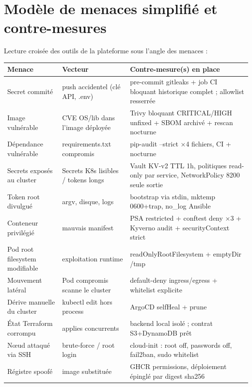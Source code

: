 \documentclass[12pt,a4paper]{article}
\begin{document}
\section{Modèle de menaces simplifié et contre-mesures}

Lecture croisée des outils de la plateforme sous l'angle des menaces :

\begin{longtable}{@{}p{3.6cm}p{5.6cm}p{5.0cm}@{}}
\toprule
\textbf{Menace} & \textbf{Vecteur} & \textbf{Contre-mesure(s) en place} \\
\midrule
\endhead
Secret commité & push accidentel (clé API, .env) & pre-commit gitleaks + job CI bloquant historique complet ; allowlist resserrée \\
Image vulnérable & CVE OS/lib dans l'image déployée & Trivy bloquant CRITICAL/HIGH unfixed + SBOM archivé + rescan nocturne \\
Dépendance vulnérable & requirements.txt compromis & pip-audit --strict ×4 fichiers, CI + nocturne \\
Secrets exposés au cluster & Secrets K8s lisibles / tokens longs & Vault KV-v2 TTL 1h, politiques read-only par service, NetworkPolicy 8200 seule sortie \\
Token root divulgué & argv, disque, logs & bootstrap via stdin, mktemp 0600+trap, no\_log Ansible \\
Conteneur privilégié & mauvais manifest & PSA restricted + conftest deny ×3 + Kyverno audit + securityContext strict \\
Pod root filesystem modifiable & exploitation runtime & readOnlyRootFilesystem + emptyDir /tmp \\
Mouvement latéral & Pod compromis scanne le cluster & default-deny ingress/egress + whitelist explicite \\
Dérive manuelle du cluster & kubectl edit hors process & ArgoCD selfHeal + prune \\
État Terraform corrompu & applies concurrents & backend local isolé ; contrat S3+DynamoDB prêt \\
Nœud attaqué via SSH & brute-force / root login & cloud-init : root off, passwords off, fail2ban, sudo whitelist \\
Régistre spoofé & image substituée & GHCR permissions, déploiement épinglé par digest sha256 \\
\bottomrule
\end{longtable}
\end{document}
